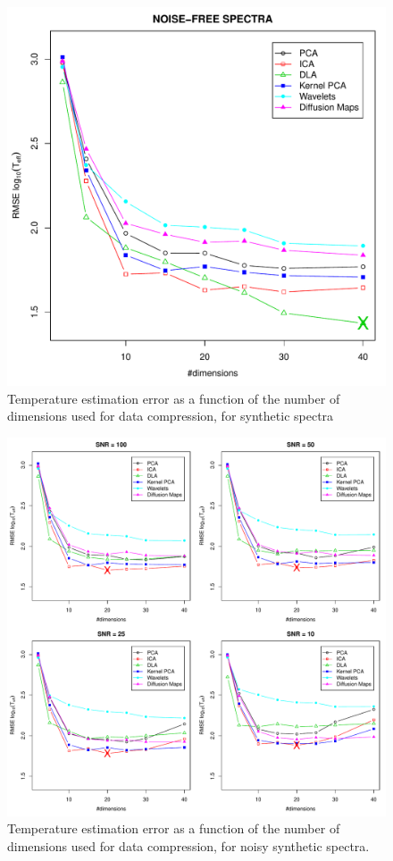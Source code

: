 \documentclass[a4paper,fleqn,usenatbib]{mnras}
\begin{document}
{{{\begin{figure}
\centering\includegraphics[width=\columnwidth]{flamesHR10_SNR=000_Teff_log_BestSVM_N-RMSE_test.pdf}
\caption{Temperature estimation error as a function of the number of
  dimensions used for data compression, for synthetic spectra}
\label{fig:01}
\end{figure}

\begin{figure}
\centering\includegraphics[width=\textwidth]{flamesHR10_Teff_log_BestSVM_N-RMSE_test.pdf}
\caption{Temperature estimation error as a function of the number of
  dimensions used for data compression, for noisy synthetic
  spectra.}
\label{fig:02}
\end{figure}

}}}
\end{document}
